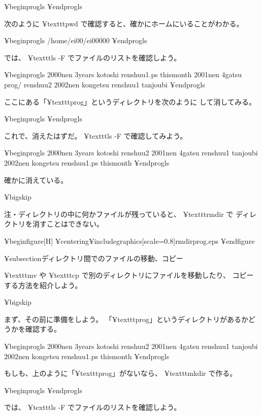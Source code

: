 {¥begin{progls}
%
¥end{progls}

次のように ¥texttt{pwd} で確認すると、確かにホームにいることがわかる。

¥begin{progls}
/home/ei00/ei00000
%
¥end{progls}

では、 ¥texttt{ls -F} でファイルのリストを確認しよう。

¥begin{progls}
2000nen         3years          kotoshi         renshuu1.ps     thismonth
2001nen         4gatsu          prog/           renshuu2
2002nen         kongetsu        renshuu1        tanjoubi
%
¥end{progls}

ここにある「¥texttt{prog}」というディレクトリを次のように
して消してみる。

¥begin{progls}
%
¥end{progls}

これで、消えたはずだ。
¥texttt{ls -F} で確認してみよう。

¥begin{progls}
2000nen         3years          kotoshi         renshuu2
2001nen         4gatsu          renshuu1        tanjoubi
2002nen         kongetsu        renshuu1.ps     thismonth
%
¥end{progls}

確かに消えている。

¥bigskip

注・ディレクトリの中に何かファイルが残っていると、 ¥texttt{rmdir} で
ディレクトリを消すことはできない。

¥begin{figure}[H]
¥centering{¥includegraphics[scale=0.8]{rmdirprog.eps}}
¥end{figure}


¥subsection{ディレクトリ間でのファイルの移動、コピー}

¥texttt{mv} や ¥texttt{cp} で別のディレクトリにファイルを移動したり、
コピーする方法を紹介しよう。

¥bigskip

まず、その前に準備をしよう。
「¥texttt{prog}」というディレクトリがあるかどうかを確認する。

¥begin{progls}
2000nen         3years          kotoshi         renshuu2
2001nen         4gatsu          renshuu1        tanjoubi
2002nen         kongetsu        renshuu1.ps     thismonth
%
¥end{progls}

もしも、上のように「¥texttt{prog}」がないなら、
¥texttt{mkdir} で作る。

¥begin{progls}
%
¥end{progls}

では、 ¥texttt{ls -F} でファイルのリストを確認しよう。

}
